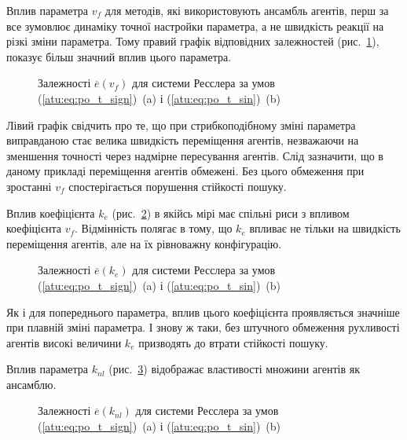 Вплив параметра
$v_f$ для методів, які використовують ансамбль агентів, перш за
все зумовлює динаміку точної настройки параметра, а не швидкість
реакції на різкі зміни параметра. Тому правий графік відповідних
залежностей (рис.~\ref{atu:f:ross_e_v_f}), показує більш значний вплив
цього параметра.

\begin{figure}[htb!]
\caption{Залежності $ \overline{e} (v_f) $ для системи Ресслера за умов (\ref{atu:eq:po_t_sign})~(a) і (\ref{atu:eq:po_t_sin})~(b)}
\label{atu:f:ross_e_v_f}
\end{figure}

Лівий графік свідчить про те, що при стрибкоподібному зміні
параметра виправданою стає велика швидкість переміщення
агентів, незважаючи на зменшення точності через надмірне
пересування агентів. Слід зазначити, що в даному прикладі
переміщення агентів обмежені. Без цього обмеження при зростанні
$ v_f $ спостерігається порушення стійкості пошуку.

Вплив коефіцієнта
$k_e$ (рис.~\ref{atu:f:ross_e_k_e}) в якійсь мірі має спільні риси
з впливом коефіцієнта
$v_f$. Відмінність полягає в тому, що
$k_e$ впливає не тільки на швидкість переміщення агентів, але
на їх рівноважну конфігурацію.

\begin{figure}[htb!]
\caption{Залежності $\overline{e}(k_e)$ для системи Ресслера за умов (\ref{atu:eq:po_t_sign})~(a) і (\ref{atu:eq:po_t_sin})~(b)}
\label{atu:f:ross_e_k_e}
\end{figure}

Як і для попереднього параметра, вплив цього коефіцієнта проявляється
значніше при плавній зміні параметра. І знову ж таки, без
штучного обмеження рухливості агентів високі величини
$k_e$ призводять до втрати стійкості пошуку.

Вплив параметра
$k_{nl}$ (рис.~\ref{atu:f:ross_e_k_nl})
відображає властивості множини агентів як ансамблю.

\begin{figure}[htb!]
\caption{Залежності $\overline{e} (k_{nl}) $ для системи Ресслера за умов (\ref{atu:eq:po_t_sign})~(a) і (\ref{atu:eq:po_t_sin})~(b)}
\label{atu:f:ross_e_k_nl}
\end{figure}

